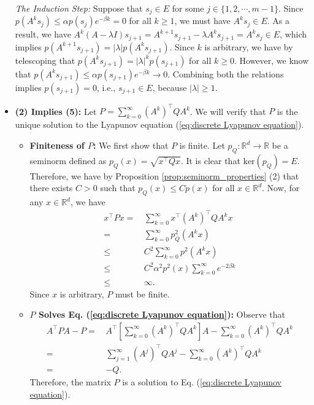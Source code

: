 \documentclass[11 pt]{article}
\begin{document}
\begin{itemize}
		\textit{The Induction Step:} Suppose that $s_j\in E$ for some $j\in \{1,2,\cdots,m-1\}$. Since $p(A^ks_j)\leq \alpha p(s_j)e^{-\beta k}=0$ for all $k\geq 1$, we must have $A^ks_j\in E$. As a result, we have $A^k(A-\lambda I)s_{j+1}=A^{k+1}s_{j+1}-\lambda A^ks_{j+1}=A^ks_j\in E$, which implies $p(A^{k+1}s_{j+1})=|\lambda| p(A^ks_{j+1})$. Since $k$ is arbitrary, we have by telescoping that $p(A^ks_{j+1})=|\lambda|^kp(s_{j+1})$ for all $k\geq 0$. However, we know that $p(A^ks_{j+1})\leq \alpha p(s_{j+1})e^{-\beta k}\rightarrow 0$. Combining both the relations implies $p(s_{j+1})=0$, i.e., $s_{j+1}\in E$, because $|\lambda|\geq 1$.
		\item \textbf{(2) Implies (5):} Let $P = \sum^\infty_{k=0} (A^k )^\top Q A^k$. We will verify that $P$ is the unique solution to the Lyapunov equation (\ref{eq:discrete Lyapunov equation}).
		\begin{itemize}
			\item \textbf{Finiteness of $P$:} We first show that $P$ is finite. Let $p_Q:\mathbb{R}^d\to \mathbb{R}$ be a seminorm defined as $p_Q(x)=\sqrt{x^\top Qx}$. It is clear that $\text{ker}(p_Q)=E$. Therefore, we have by Proposition \ref{prop:seminorm_properties} (2) that there exists $C>0$ such that $p_Q(x)\leq Cp(x)$ for all $x\in\mathbb{R}^d$. Now, for any $x\in\mathbb{R}^d$, we have
			\begin{align*}
				x^\top P x =\,& \sum^{\infty}_{k=0} x^\top\left(A^k \right)^\top Q A^k x \\
				= \,&\sum^{\infty}_{k=0} p_Q^2(A^kx)\\
				\leq \,&C^2\sum^{\infty}_{k=0} p^2(A^kx)\\
				\leq \,&C^2\alpha^2p^2(x)\sum^{\infty}_{k=0} e^{-2\beta k}\\
				\leq \,&\infty.
			\end{align*}
			Since $x$ is arbitrary, $P$ must be finite.
			\item \textbf{$P$ Solves Eq. (\ref{eq:discrete Lyapunov equation}):} Observe that
			\begin{align*}
				A^\top P A - P =\,& A^\top \left[\sum^\infty_{k=0} \left(A^k \right)^\top Q A^k \right] A - \sum^\infty_{k=0} \left(A^k \right)^\top Q A^k\\
				=\,& \sum^\infty_{j=1} \left(A^j \right)^\top Q A^j - \sum^\infty_{k=0} \left(A^k \right)^\top Q A^k\\
				=\,& -Q.
			\end{align*}
			Therefore, the matrix $P$ is a solution to Eq. (\ref{eq:discrete Lyapunov equation}).

\end{itemize}
\end{itemize}
\end{document}
